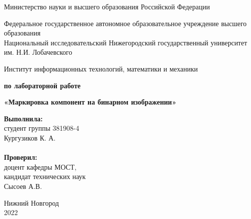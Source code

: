 \documentclass{report}
\begin{document}
\begin{titlepage}

\begin{center}
Министерство науки и высшего образования Российской Федерации
\end{center}

\begin{center}
Федеральное государственное автономное образовательное учреждение высшего образования \\
Национальный исследовательский Нижегородский государственный университет им. Н.И. Лобачевского
\end{center}

\begin{center}
Институт информационных технологий, математики и механики
\end{center}

\vspace{4em}

\begin{center}
\textbf{ по лабораторной работе} \\
\end{center}
\begin{center}
\textbf{\Large«Маркировка компонент на бинарном изображении»} \\
\end{center}

\vspace{4em}

\newbox{\lbox}
\newlength{\maxl}
\setlength{\maxl}{\wd\lbox}
\hfill\parbox{7cm}{
\hspace*{5cm}\hspace*{-5cm}\textbf{Выполнила:} \\ студент группы 381908-4 \\ Кургузиков К. А.\\
\\
\hspace*{5cm}\hspace*{-5cm}\textbf{Проверил:}\\ доцент кафедры МОСТ, \\ кандидат технических наук \\ Сысоев А.В.\\
}
\vspace{\fill}

\begin{center} Нижний Новгород \\ 2022 \end{center}

\end{titlepage}
\end{document}
